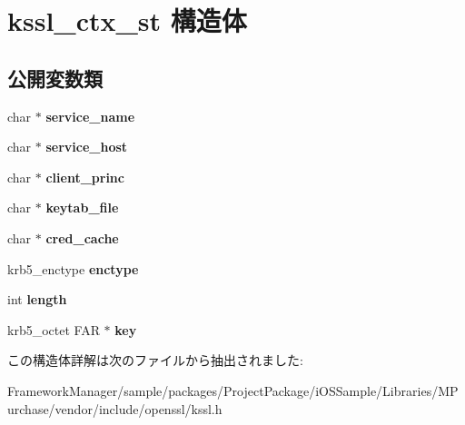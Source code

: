 \hypertarget{structkssl__ctx__st}{}\section{kssl\+\_\+ctx\+\_\+st 構造体}
\label{structkssl__ctx__st}
\subsection*{公開変数類}
\begin{DoxyCompactItemize}
\item 
\hypertarget{structkssl__ctx__st_aa3718a1a94ac4672f04ca7954a98a223}{}char $\ast$ {\bfseries service\+\_\+name}\label{structkssl__ctx__st_aa3718a1a94ac4672f04ca7954a98a223}

\item 
\hypertarget{structkssl__ctx__st_a9e935f8bd1ec769ea106132b4f9740a1}{}char $\ast$ {\bfseries service\+\_\+host}\label{structkssl__ctx__st_a9e935f8bd1ec769ea106132b4f9740a1}

\item 
\hypertarget{structkssl__ctx__st_a3f6597936d5553b09f5d1d8884447497}{}char $\ast$ {\bfseries client\+\_\+princ}\label{structkssl__ctx__st_a3f6597936d5553b09f5d1d8884447497}

\item 
\hypertarget{structkssl__ctx__st_a062001f88d34d875c9ff6a6617d50e05}{}char $\ast$ {\bfseries keytab\+\_\+file}\label{structkssl__ctx__st_a062001f88d34d875c9ff6a6617d50e05}

\item 
\hypertarget{structkssl__ctx__st_a80431e8d0b576a77f20d4db223ac93ab}{}char $\ast$ {\bfseries cred\+\_\+cache}\label{structkssl__ctx__st_a80431e8d0b576a77f20d4db223ac93ab}

\item 
\hypertarget{structkssl__ctx__st_a04ef1cbb535de6f76263cf5ab320c44d}{}krb5\+\_\+enctype {\bfseries enctype}\label{structkssl__ctx__st_a04ef1cbb535de6f76263cf5ab320c44d}

\item 
\hypertarget{structkssl__ctx__st_a45cb713dc110c383dbcedff5ab5ddf61}{}int {\bfseries length}\label{structkssl__ctx__st_a45cb713dc110c383dbcedff5ab5ddf61}

\item 
\hypertarget{structkssl__ctx__st_a5732159f66408b496e367b88685835af}{}krb5\+\_\+octet F\+A\+R $\ast$ {\bfseries key}\label{structkssl__ctx__st_a5732159f66408b496e367b88685835af}

\end{DoxyCompactItemize}


この構造体詳解は次のファイルから抽出されました\+:\begin{DoxyCompactItemize}
\item 
Framework\+Manager/sample/packages/\+Project\+Package/i\+O\+S\+Sample/\+Libraries/\+M\+Purchase/vendor/include/openssl/kssl.\+h\end{DoxyCompactItemize}
